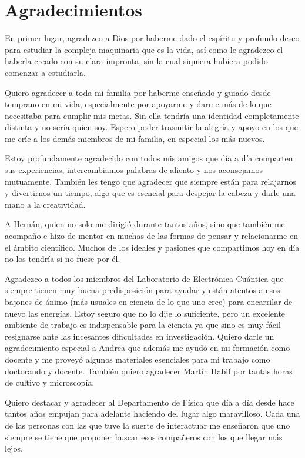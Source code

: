 \chapter*{Agradecimientos}


En primer lugar, agradezco a Dios por haberme dado el espíritu y profundo deseo para estudiar la compleja maquinaria que es la vida, así como le agradezco el haberla creado con su clara impronta, sin la cual siquiera hubiera podido comenzar a estudiarla.

Quiero agradecer a toda mi familia por haberme enseñado y guiado desde temprano en mi vida, especialmente por apoyarme y darme más de lo que necesitaba para cumplir mis metas. Sin ella tendría una identidad completamente distinta y no sería quien soy. Espero poder trasmitir la alegría y apoyo en los que me críe a los demás miembros de mi familia, en especial los más nuevos.

Estoy profundamente agradecido con todos mis amigos que día a día comparten sus experiencias, intercambiamos palabras de aliento y nos aconsejamos mutuamente. También les tengo que agradecer que siempre están para relajarnos y divertirnos un tiempo, algo que es esencial para despejar la cabeza y darle una mano a la creatividad.

A Hernán, quien no solo me dirigió durante tantos años, sino que también me acompaño e hizo de mentor en muchas de las formas de pensar y relacionarme en el ámbito científico. Muchos de los ideales y pasiones que compartimos hoy en día no los tendría si no fuese por él.

Agradezco a todos los miembros del Laboratorio de Electrónica Cuántica que siempre tienen muy buena predisposición para ayudar y están atentos a esos bajones de ánimo (más usuales en ciencia de lo que uno cree) para encarrilar de nuevo las energías. Estoy seguro que no lo dije lo suficiente, pero un excelente ambiente de trabajo es indispensable para la ciencia ya que sino es muy fácil resignarse ante las incesantes dificultades en investigación. Quiero darle un agradecimiento especial a Andrea que además me ayudó en mi formación como docente y me proveyó algunos materiales esenciales para mi trabajo como doctorando y docente. También quiero agradecer Martín Habif por tantas horas de cultivo y microscopía.

Quiero destacar y agradecer al Departamento de Física que día a día desde hace tantos años empujan para adelante haciendo del lugar algo maravilloso. Cada una de las personas con las que tuve la suerte de interactuar me enseñaron que uno siempre se tiene que proponer buscar esos compañeros con los que llegar más lejos.

